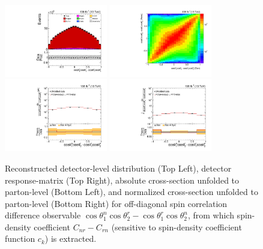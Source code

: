 \clearpage
\begin{figure}[htb]
\begin{center}
 \includegraphics[width=0.40\textwidth]{fig_fullRun2UL/controlplots/combined/Hyp_LLBarCMnr.pdf}
 \includegraphics[width=0.40\textwidth]{fig_fullRun2UL/unfolding/combined/ResponseMatrix_c_Mnr.pdf} \\
 \includegraphics[width=0.40\textwidth]{fig_fullRun2UL/unfolding/combined/UnfoldedResults_c_Mnr.pdf}
 \includegraphics[width=0.40\textwidth]{fig_fullRun2UL/unfolding/combined/UnfoldedResultsNorm_c_Mnr.pdf} \\
\label{fig:c_Mnr}
\caption{Reconstructed detector-level distribution (Top Left), detector response-matrix (Top Right), absolute cross-section unfolded to parton-level (Bottom Left), and normalized cross-section unfolded to parton-level (Bottom Right) for off-diagonal spin correlation difference observable $\cos\theta_{1}^{n}\cos\theta_{2}^{r}-\cos\theta_{1}^{r}\cos\theta_{2}^{n}$, from which spin-density coefficient $C_{nr}-C_{rn}$ (sensitive to spin-density coefficient function $c_k$) is extracted.}
\end{center}
\end{figure}
